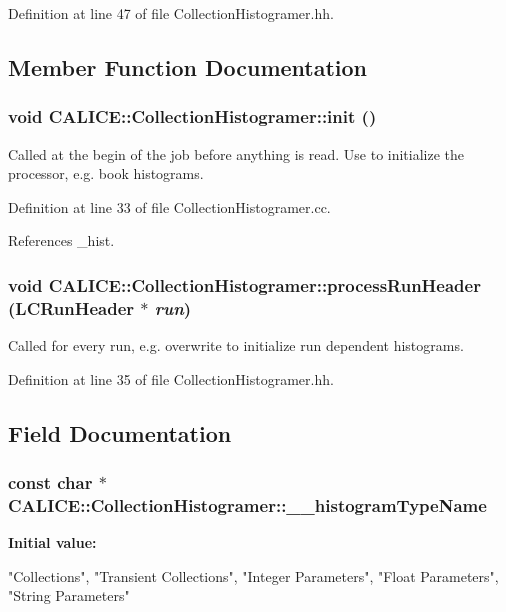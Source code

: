 Definition at line 47 of file CollectionHistogramer.hh.

\subsection{Member Function Documentation}
\subsubsection[{init}]{\setlength{\rightskip}{0pt plus 5cm}void CALICE::CollectionHistogramer::init ()}\label{classCALICE_1_1CollectionHistogramer_acbc3acffe6b5a999540387f8afb6cb36}


Called at the begin of the job before anything is read. Use to initialize the processor, e.g. book histograms. 

Definition at line 33 of file CollectionHistogramer.cc.

References \_\-hist.
\subsubsection[{processRunHeader}]{\setlength{\rightskip}{0pt plus 5cm}void CALICE::CollectionHistogramer::processRunHeader (LCRunHeader $\ast$ {\em run})\hspace{0.3cm}{\ttfamily  [inline]}}\label{classCALICE_1_1CollectionHistogramer_ae055ee45bf5b4fea658805219b6cfa5c}


Called for every run, e.g. overwrite to initialize run dependent histograms. 

Definition at line 35 of file CollectionHistogramer.hh.

\subsection{Field Documentation}
\subsubsection[{\_\-\_\-histogramTypeName}]{\setlength{\rightskip}{0pt plus 5cm}const char $\ast$ {\bf CALICE::CollectionHistogramer::\_\-\_\-histogramTypeName}\hspace{0.3cm}{\ttfamily  [static, protected]}}\label{classCALICE_1_1CollectionHistogramer_a81e846127f3559c1e127748408ced91d}
{\bfseries Initial value:}
\begin{DoxyCode}
{
    "Collections", 
    "Transient Collections",
    "Integer Parameters",
    "Float Parameters",
    "String Parameters"
  }
\end{DoxyCode}


